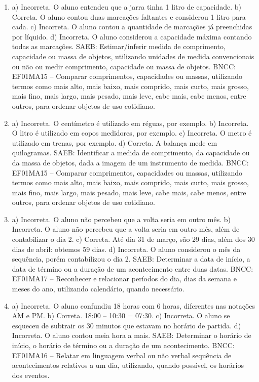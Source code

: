 \begin{enumerate}
\item
a) Incorreta. O aluno entendeu que a jarra tinha 1 litro de capacidade.
b) Correta. O aluno contou duas marcações faltantes e considerou 1
litro para cada.
c) Incorreta. O aluno contou a quantidade de marcações já preenchidas
por líquido.
d) Incorreta. O aluno considerou a capacidade máxima contando todas as marcações.
SAEB: Estimar/inferir medida de comprimento, capacidade ou massa
de objetos, utilizando unidades de medida convencionais ou não ou medir
comprimento, capacidade ou massa de objetos.
BNCC: EF01MA15 -- Comparar comprimentos, capacidades ou massas,
utilizando termos como mais alto, mais baixo, mais comprido, mais curto,
mais grosso, mais fino, mais largo, mais pesado, mais leve, cabe mais,
cabe menos, entre outros, para ordenar objetos de uso cotidiano.

\item
a) Incorreta. O centímetro é utilizado em réguas, por exemplo.
b) Incorreta. O litro é utilizado em copos medidores, por exemplo.
c) Incorreta. O metro é utilizado em trenas, por exemplo.
d) Correta. A balança mede em quilogramas.
SAEB: Identificar a medida de comprimento, da capacidade ou da
massa de objetos, dada a imagem de um instrumento de medida.
BNCC: EF01MA15 -- Comparar comprimentos, capacidades ou massas,
utilizando termos como mais alto, mais baixo, mais comprido, mais curto,
mais grosso, mais fino, mais largo, mais pesado, mais leve, cabe mais,
cabe menos, entre outros, para ordenar objetos de uso cotidiano.

\item
a) Incorreta. O aluno não percebeu que a volta seria em outro mês.
b) Incorreta. O aluno não percebeu que a volta seria em outro mês, além
de contabilizar o dia 2.
c) Correta. Até dia 31 de março, são 29 dias, além dos 30 dias de abril: obtemos
59 dias.
d) Incorreta. O aluno considerou o mês da sequência, porém contabilizou
o dia 2.
SAEB: Determinar a data de início, a data de término ou a
duração de um acontecimento entre duas datas.
BNCC: EF01MA17 -- Reconhecer e relacionar períodos do dia, dias da semana
e meses do ano, utilizando calendário, quando necessário.

\item
a) Incorreta. O aluno confundiu 18 horas com 6 horas, diferentes nas notações AM e PM.
b) Correta. 18:00 -- 10:30 = 07:30.
c) Incorreta. O aluno se esqueceu de subtrair os 30 minutos que estavam no horário de partida.
d) Incorreta. O aluno contou meia hora a mais.
SAEB: Determinar o horário de início, o horário de término ou a
duração de um acontecimento.
BNCC: EF01MA16 -- Relatar em linguagem verbal ou não verbal sequência de
acontecimentos relativos a um dia, utilizando, quando possível, os
horários dos eventos.


\end{enumerate}
